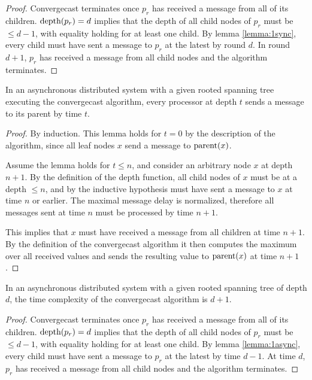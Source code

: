 \begin{proof}
Convergecast terminates once $p_r$ has received a message from all of its children.
$\text{depth}(p_r) = d$ implies that the depth of all child nodes of $p_r$ must be
$\leq d - 1$, with equality holding for at least one child. By lemma \ref{lemma:1sync},
every child must have sent a message to $p_r$ at the latest by round $d$. In round
$d + 1$, $p_r$ has received a message from all child nodes and the algorithm terminates.
\end{proof}

\begin{lemma} \label{lemma:1async}
In an asynchronous distributed system with a given rooted spanning tree executing the convergecast
algorithm, every processor at depth $t$ sends a message to its parent by time $t$.
\end{lemma}

\begin{proof}
By induction. This lemma holds for $t = 0$ by the description of the algorithm,
since all leaf nodes $x$ send a message to $\text{parent}(x)$.

Assume the lemma holds for $t \leq n$, and consider an arbitrary node $x$ at depth
$n + 1$. By the definition of the depth function, all child nodes of $x$ must be at
a depth $\leq n$, and by the inductive hypothesis must have sent a message to
$x$ at time $n$ or earlier. 
The maximal message delay is normalized, therefore all messages sent at time $n$
must be processed by time $n + 1$.

This implies that $x$ must have received
a message from all children at time $n + 1$. By the definition of the
convergecast algorithm it then computes the maximum over all received values and
sends the resulting value to $\text{parent}(x)$ at time $n + 1$.
\end{proof}

\begin{theorem}
In an asynchronous distributed system with a given rooted spanning tree of depth $d$, the time
complexity of the convergecast algorithm is $d + 1$.
\end{theorem}

\begin{proof}
Convergecast terminates once $p_r$ has received a message from all of its children.
$\text{depth}(p_r) = d$ implies that the depth of all child nodes of $p_r$ must be
$\leq d - 1$, with equality holding for at least one child. By lemma \ref{lemma:1async},
every child must have sent a message to $p_r$ at the latest by time $d - 1$. At time
$d$, $p_r$ has received a message from all child nodes and the algorithm terminates.
\end{proof}

